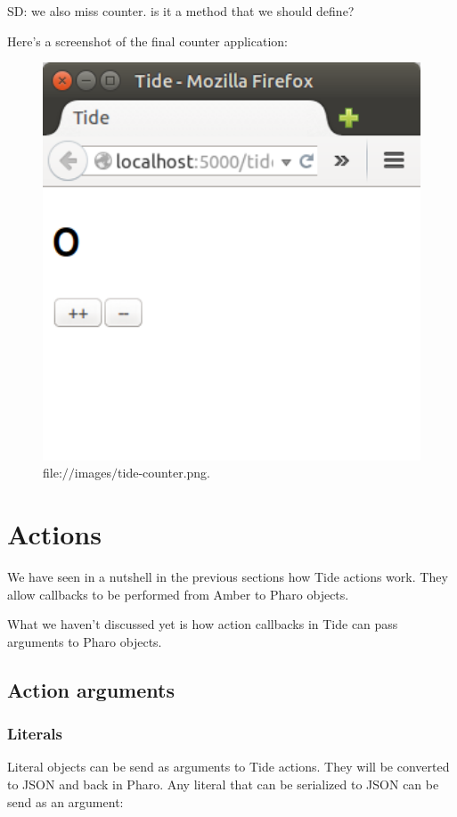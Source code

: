 \documentclass[a4paper,10pt,twoside]{book}
\begin{document}
SD: we also miss counter. is it a method that we should define?

Here's a screenshot of the final counter application:


\begin{figure}

\begin{center}
\includegraphics[width=1.0\textwidth]{images/tide-counter.png}\caption{file:$/$$/$images$/$tide-counter.png.\label{images/tide-counter.png}}\end{center}
\end{figure}

\chapter{ Actions}
We have seen in a nutshell in the previous sections how Tide actions work. They allow callbacks
to be performed from Amber to Pharo objects.

What we haven't discussed yet is how action callbacks in Tide can pass arguments to Pharo objects.
\section{ Action arguments}\subsection{ Literals}
Literal objects can be send as arguments to Tide actions. They will be converted to JSON and back in
Pharo. Any literal that can be serialized to JSON can be send as an argument:
\end{document}
